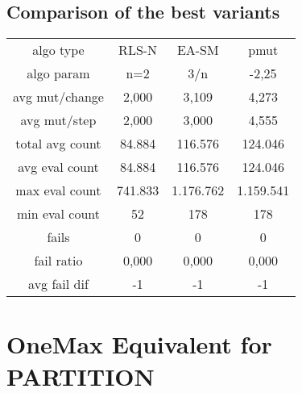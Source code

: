 \subsection{Comparison of the best variants}

\begin{tabular}[h]{cccc}
algo type&            RLS-N&     EA-SM&      pmut\\
algo param&             n=2&       3/n&     -2,25\\
avg mut/change&       2,000&     3,109&     4,273\\
avg mut/step&         2,000&     3,000&     4,555\\
\hline
total avg count&     84.884&   116.576&   124.046\\
avg eval count&      84.884&   116.576&   124.046\\
max eval count&     741.833& 1.176.762& 1.159.541\\
min eval count&          52&       178&       178\\
\hline
fails&                    0&         0&         0\\
fail ratio&           0,000&     0,000&     0,000\\
avg fail dif&            -1&        -1&        -1\\
\end{tabular}

\section{OneMax Equivalent for PARTITION}

